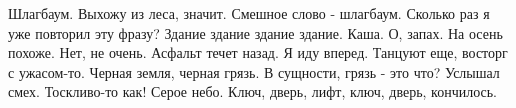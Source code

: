 \documentclass{article}
\begin{document}
Шлагбаум. Выхожу из леса, значит. Смешное слово - шлагбаум. Сколько раз я уже повторил эту фразу? Здание здание здание здание. Каша. О, запах. На осень похоже. Нет, не очень. Асфальт течет назад. Я иду вперед. Танцуют еще, восторг с ужасом-то. Черная земля, черная грязь. В сущности, грязь - это что? Услышал смех. Тоскливо-то как! Серое небо. Ключ, дверь, лифт, ключ, дверь, кончилось.
\end{document}
